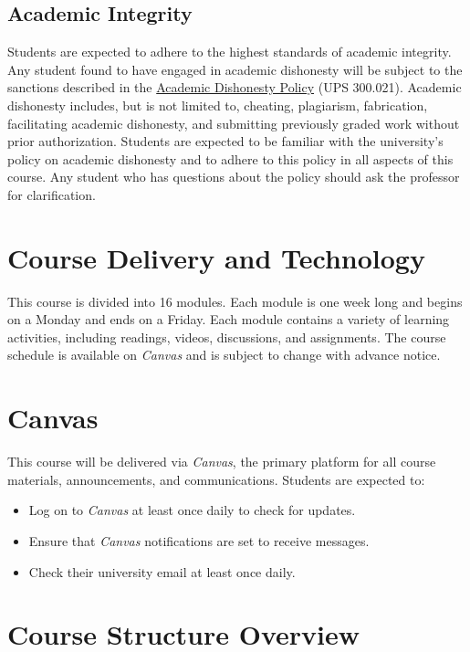 \documentclass[12pt, letterpaper]{article}
\begin{document}
\subsection*{Academic Integrity}
Students are expected to adhere to the highest standards of academic integrity. Any student found to have engaged in academic dishonesty will be subject to the sanctions described in the \href{https://www.fullerton.edu/senate/publications_policies_resolutions/ups/UPS%20300/UPS%20300.021.pdf}{Academic Dishonesty Policy} (UPS 300.021). Academic dishonesty includes, but is not limited to, cheating, plagiarism, fabrication, facilitating academic dishonesty, and submitting previously graded work without prior authorization. Students are expected to be familiar with the university's policy on academic dishonesty and to adhere to this policy in all aspects of this course. Any student who has questions about the policy should ask the professor for clarification.

\section*{Course Delivery and Technology}

This course is divided into 16 modules. Each module is one week long and begins on a Monday and ends on a Friday. Each module contains a variety of learning activities, including readings, videos, discussions, and assignments. The course schedule is available on \emph{Canvas} and is subject to change with advance notice.

\section*{Canvas}

This course will be delivered via \emph{Canvas}, the primary platform for all course materials, announcements, and communications. Students are expected to:
\begin{itemize}
    \item Log on to \emph{Canvas} at least once daily to check for updates.
    \item Ensure that \emph{Canvas} notifications are set to receive messages.
    \item Check their university email at least once daily.
\end{itemize}

\section*{Course Structure Overview}
\end{document}
